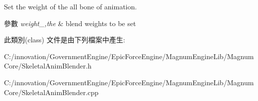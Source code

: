 Set the weight of the all bone of animation. 


\begin{DoxyParams}{參數}
{\em weight\+\_\+,the} & blend weights to be set \\
\hline
\end{DoxyParams}


此類別(class) 文件是由下列檔案中產生\+:\begin{DoxyCompactItemize}
\item 
C\+:/innovation/\+Government\+Engine/\+Epic\+Force\+Engine/\+Magnum\+Engine\+Lib/\+Magnum\+Core/Skeletal\+Anim\+Blender.\+h\item 
C\+:/innovation/\+Government\+Engine/\+Epic\+Force\+Engine/\+Magnum\+Engine\+Lib/\+Magnum\+Core/Skeletal\+Anim\+Blender.\+cpp\end{DoxyCompactItemize}

